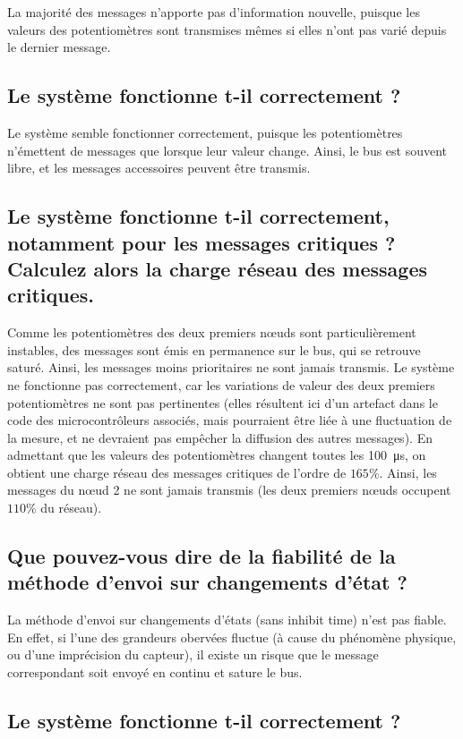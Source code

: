 \documentclass[12pt]{article}
\begin{document}
La majorité des messages n'apporte pas d'information nouvelle, puisque les valeurs des potentiomètres sont transmises mêmes si elles n'ont pas varié depuis le dernier message.

\subsection{Le système fonctionne t-il correctement ?}

Le système semble fonctionner correctement, puisque les potentiomètres n'émettent de messages que lorsque leur valeur change. Ainsi, le bus est souvent libre, et les messages accessoires peuvent être transmis.

\subsection{Le système fonctionne t-il correctement, notamment pour les messages critiques ? Calculez alors la charge réseau des messages critiques.}

Comme les potentiomètres des deux premiers nœuds sont particulièrement instables, des messages sont émis en permanence sur le bus, qui se retrouve saturé. Ainsi, les messages moins prioritaires ne sont jamais transmis. Le système ne fonctionne pas correctement, car les variations de valeur des deux premiers potentiomètres ne sont pas pertinentes (elles résultent ici d'un artefact dans le code des microcontrôleurs associés, mais pourraient être liée à une fluctuation de la mesure, et ne devraient pas empêcher la diffusion des autres messages). En admettant que les valeurs des potentiomètres changent toutes les \SI{100}{\micro\second}, on obtient une charge réseau des messages critiques de l'ordre de $165\%$. Ainsi, les messages du nœud 2 ne sont jamais transmis (les deux premiers nœuds occupent $110\%$ du réseau).

\subsection{Que pouvez-vous dire de la fiabilité de la méthode d'envoi sur changements d'état ?}

La méthode d'envoi sur changements d'états (sans inhibit time) n'est pas fiable. En effet, si l'une des grandeurs obervées fluctue (à cause du phénomène physique, ou d'une imprécision du capteur), il existe un risque que le message correspondant soit envoyé en continu et sature le bus.

\subsection{Le système fonctionne t-il correctement ?}
\end{document}
